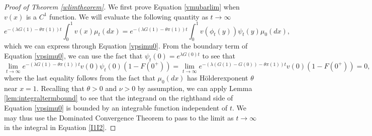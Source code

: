 \documentclass[11pt]{article}
\numberwithin{equation}{section}
\newcommand{\holder}{H{\"o}lder\:}
\begin{document}
{\begin{proof}[Proof of Theorem \ref{wlimtheorem}]
We first prove Equation \eqref{vmubarlim} when $v(x)$ is a $C^1$ function. We will evaluate the following quantity as $t\to \infty$
\begin{equation}
e^{-(\lambda G(1)-\theta \pi(1))t} \int_0^1 v(x)\mu_t(dx) 
=e^{-(\lambda G(1)-\theta \pi(1))t} \int_0^1 v(\phi_t(y))\psi_t(y)\mu_0(dx),
\end{equation}
which we can express through Equation \eqref{vpsimu0}. From the boundary term of Equation \eqref{vpsimu0}, we can use the fact that $\psi_t(0)=e^{\lambda G(0) t}$ to see that
\begin{equation}\label{bdryest}
\lim_{t\to \infty} e^{-(\lambda G(1)-\theta \pi(1))t} v(0)\psi_t(0)(1-F(0^+)) 
=\lim_{t\to \infty} e^{-(\lambda(G(1)-G(0))-\theta \pi(1))t}v(0)(1-F(0^+))=0,
\end{equation}
where the last equality follows from the fact that $\mu_0(dx)$ has \holder exponent $\theta$ near $x=1$. Recalling that $\theta>0$ and $\nu>0$ by assumption, we can apply Lemma \ref{lem:integraltermbound} to see that the integrand on the righthand side of Equation \eqref{vpsimu0} is bounded by an integrable function independent of $t$. We may thus use the Dominated Convergence Theorem to pass to the limit as $t\to \infty$ in the integral in Equation \eqref{I1I2}.


\end{proof}}
\end{document}
